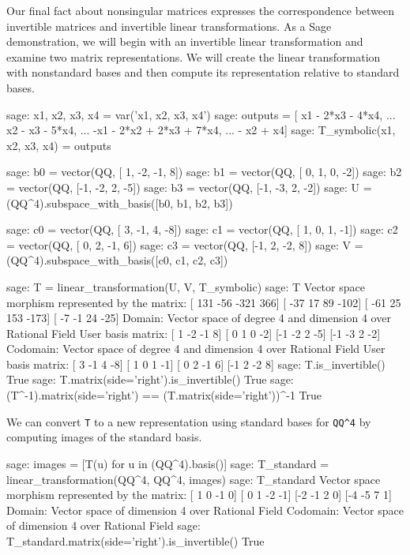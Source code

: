 Our final fact about nonsingular matrices expresses the correspondence between invertible matrices and invertible linear transformations.  As a Sage demonstration, we will begin with an invertible linear transformation and examine two matrix representations.  We will create the linear transformation with nonstandard bases and then compute its representation relative to standard bases.
%
\begin{sageexample}
sage: x1, x2, x3, x4 = var('x1, x2, x3, x4')
sage: outputs = [ x1        - 2*x3 - 4*x4,
...                      x2 -   x3 - 5*x4,
...              -x1 - 2*x2 + 2*x3 + 7*x4,
...                  -   x2        +   x4]
sage: T_symbolic(x1, x2, x3, x4) = outputs

sage: b0 = vector(QQ, [ 1, -2, -1,  8])
sage: b1 = vector(QQ, [ 0,  1,  0, -2])
sage: b2 = vector(QQ, [-1, -2,  2, -5])
sage: b3 = vector(QQ, [-1, -3,  2, -2])
sage: U = (QQ^4).subspace_with_basis([b0, b1, b2, b3])

sage: c0 = vector(QQ, [ 3, -1,  4, -8])
sage: c1 = vector(QQ, [ 1,  0,  1, -1])
sage: c2 = vector(QQ, [ 0,  2, -1,  6])
sage: c3 = vector(QQ, [-1,  2, -2,  8])
sage: V = (QQ^4).subspace_with_basis([c0, c1, c2, c3])

sage: T = linear_transformation(U, V, T_symbolic)
sage: T
Vector space morphism represented by the matrix:
[ 131  -56 -321  366]
[ -37   17   89 -102]
[ -61   25  153 -173]
[  -7   -1   24  -25]
Domain: Vector space of degree 4 and dimension 4 over Rational Field
User basis matrix:
[ 1 -2 -1  8]
[ 0  1  0 -2]
[-1 -2  2 -5]
[-1 -3  2 -2]
Codomain: Vector space of degree 4 and dimension 4 over Rational Field
User basis matrix:
[ 3 -1  4 -8]
[ 1  0  1 -1]
[ 0  2 -1  6]
[-1  2 -2  8]
sage: T.is_invertible()
True
sage: T.matrix(side='right').is_invertible()
True
sage: (T^-1).matrix(side='right') == (T.matrix(side='right'))^-1
True
\end{sageexample}
%
We can convert \verb?T? to a new representation using standard bases for \verb?QQ^4? by computing images of the standard basis.
%
\begin{sageexample}
sage: images = [T(u) for u in (QQ^4).basis()]
sage: T_standard = linear_transformation(QQ^4, QQ^4, images)
sage: T_standard
Vector space morphism represented by the matrix:
[ 1  0 -1  0]
[ 0  1 -2 -1]
[-2 -1  2  0]
[-4 -5  7  1]
Domain: Vector space of dimension 4 over Rational Field
Codomain: Vector space of dimension 4 over Rational Field
sage: T_standard.matrix(side='right').is_invertible()
True
\end{sageexample}
